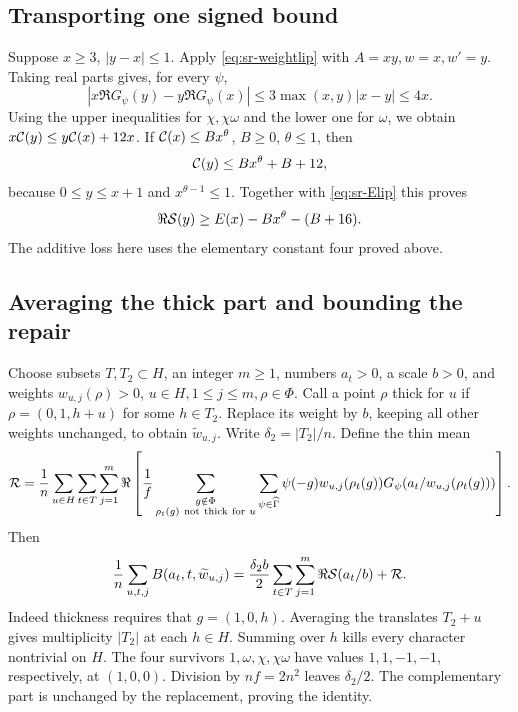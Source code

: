 \subsection{Transporting one signed bound}
Suppose \(x\geq3\), \(|y-x|\leq1\).
Apply \eqref{eq:sr-weightlip} with \(A=xy,w=x,w'=y\).
Taking real parts gives, for every \(\psi\),
\[
 |x\Re G_\psi(y)-y\Re G_\psi(x)|
 \leq3\max(x,y)|x-y|\leq4x.
\]
Using the upper inequalities for \(\chi,\chi\omega\) and the lower
one for \(\omega\), we obtain
\(x{\cal C}(y)\leq y{\cal C}(x)+12x\).
If \({\cal C}(x)\leq Bx^\theta\), \(B\geq0\), \(\theta\leq1\), then
\[
 {\cal C}(y)\leq Bx^\theta+B+12,
\]
because \(0\leq y\leq x+1\) and \(x^{\theta-1}\leq1\).
Together with \eqref{eq:sr-Elip} this proves
\begin{equation}\label{eq:sr-signaltransport}
 \Re{\cal S}(y)\geq E(x)-Bx^\theta-(B+16).
\end{equation}
The additive loss here uses the elementary constant four proved above.

\subsection{Averaging the thick part and bounding the repair}
Choose subsets \(T,T_2\subset H\), an integer \(m\geq1\),
numbers \(a_t>0\), a scale \(b>0\), and weights
\(w_{u,j}(\rho)>0\), \(u\in H,1\leq j\leq m,\rho\in\Phi\).
Call a point \(\rho\) thick for \(u\) if
\(\rho=(0,1,h+u)\) for some \(h\in T_2\).
Replace its weight by \(b\), keeping all other weights unchanged,
to obtain \(\widetilde w_{u,j}\).
Write \(\delta_2=|T_2|/n\). Define the thin mean
\[
 {\cal R}=\frac1n\sum_{u\in H}\sum_{t\in T}\sum_{j=1}^m
 \Re\left[\frac1f
 \sum_{\substack{g\notin\Phi\\\rho_t(g)\ {\rm not\ thick\ for}\ u}}
 \sum_{\psi\in\widehat\Gamma}
 \psi(-g)w_{u,j}(\rho_t(g))
 G_\psi(a_t/w_{u,j}(\rho_t(g)))\right].
\]
Then
\begin{equation}\label{eq:sr-thick}
 \frac1n\sum_{u,t,j}B(a_t,t,\widetilde w_{u,j})
 =\frac{\delta_2b}{2}\sum_{t\in T}\sum_{j=1}^m
       \Re{\cal S}(a_t/b)+{\cal R}.
\end{equation}
Indeed thickness requires that \(g=(1,0,h)\).
Averaging the translates \(T_2+u\) gives multiplicity \(|T_2|\)
at each \(h\in H\). Summing over \(h\) kills every character nontrivial
on \(H\). The four survivors \(1,\omega,\chi,\chi\omega\) have values
\(1,1,-1,-1\), respectively, at \((1,0,0)\).
Division by \(nf=2n^2\) leaves \(\delta_2/2\).
The complementary part is unchanged by the replacement, proving the identity.

